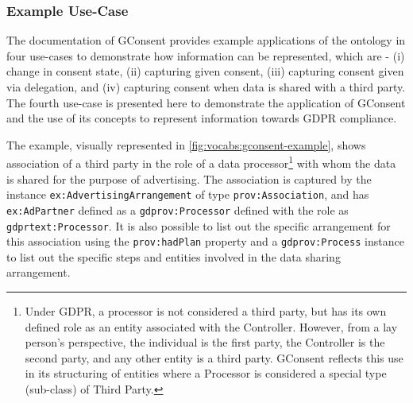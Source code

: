 \subsubsection{Example Use-Case}
The documentation of GConsent provides example applications of the ontology in four use-cases to demonstrate how information can be represented, which are - (i) change in consent state, (ii) capturing given consent, (iii) capturing consent given via delegation, and (iv) capturing consent when data is shared with a third party.
The fourth use-case is presented here to demonstrate the application of GConsent and the use of its concepts to represent information towards GDPR compliance.

The example, visually represented in \autoref{fig:vocabs:gconsent-example}, shows association of a third party in the role of a data processor\footnote{Under GDPR, a processor is not considered a third party, but has its own defined role as an entity associated with the Controller. However, from a lay person's perspective, the individual is the first party, the Controller is the second party, and any other entity is a third party. GConsent reflects this use in its structuring of entities where a Processor is considered a special type (sub-class) of Third Party.}
with whom the data is shared for the purpose of advertising. The association is captured by the instance \texttt{ex:AdvertisingArrangement} of type \texttt{prov:Association}, and has \texttt{ex:AdPartner} defined as a \texttt{gdprov:Processor} defined with the role as \texttt{gdprtext:Processor}. It is also possible to list out the specific arrangement for this association using the \texttt{prov:hadPlan} property and a \texttt{gdprov:Process} instance to list out the specific steps and entities involved in the data sharing arrangement.

